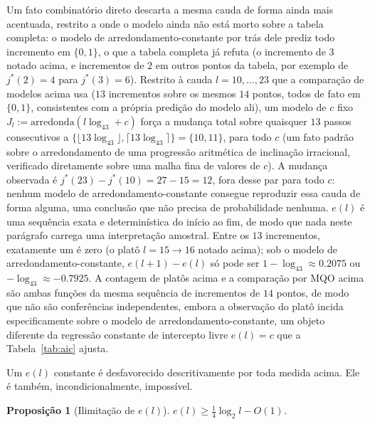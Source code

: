 \documentclass[11pt]{amsart}
\theoremstyle{plain}
\newtheorem{proposition}[theorem]{Proposi\c{c}\~ao}
\theoremstyle{definition}
\theoremstyle{remark}
\begin{document}
Um fato combinatório direto descarta a mesma cauda de forma ainda mais acentuada, restrito a onde o
modelo ainda não está morto sobre a tabela completa: o modelo de arredondamento-constante por trás
dele prediz todo incremento em $\{0,1\}$, o que a tabela completa já refuta (o incremento de $3$
notado acima, e incrementos de $2$ em outros pontos da tabela, por exemplo de $j^*(2)=4$ para
$j^*(3)=6$). Restrito à cauda $l=10,\dots,23$ que a comparação de modelos acima usa ($13$
incrementos sobre os mesmos $14$ pontos, todos de fato em $\{0,1\}$, consistentes com a própria
predição do modelo ali), um modelo de $c$ fixo $J_l:=\mathrm{arredonda}(l\log_43+c)$ força a
mudança total sobre quaisquer $13$ passos consecutivos a
$\{\lfloor13\log_43\rfloor,\lceil13\log_43\rceil\}=\{10,11\}$, para todo $c$ (um fato padrão sobre
o arredondamento de uma progressão aritmética de inclinação irracional, verificado diretamente
sobre uma malha fina de valores de $c$). A mudança observada é $j^*(23)-j^*(10)=27-15=12$, fora
desse par para todo $c$: nenhum modelo de arredondamento-constante consegue reproduzir essa cauda
de forma alguma, uma conclusão que não precisa de probabilidade nenhuma. $e(l)$ é uma sequência
exata e determinística do início ao fim, de modo que nada neste parágrafo carrega uma interpretação
amostral. Entre os $13$ incrementos, exatamente um é zero (o platô $l=15\to16$ notado acima); sob o
modelo de arredondamento-constante, $e(l+1)-e(l)$ só pode ser $1-\log_43\approx0.2075$ ou
$-\log_43\approx-0.7925$. A contagem de platôs acima e a comparação por MQO acima são ambas funções
da mesma sequência de incrementos de $14$ pontos, de modo que não são conferências independentes,
embora a observação do platô incida especificamente sobre o modelo de arredondamento-constante, um
objeto diferente da regressão constante de intercepto livre $e(l)=c$ que a Tabela~\ref{tab:aic}
ajusta.

Um $e(l)$ constante é desfavorecido descritivamente por toda medida acima. Ele é também,
incondicionalmente, impossível.

\begin{proposition}[Ilimitação de $e(l)$]
\label{prop:lowerbound}
$e(l) \ge \tfrac14\log_2 l - O(1)$.
\end{proposition}
\end{document}
